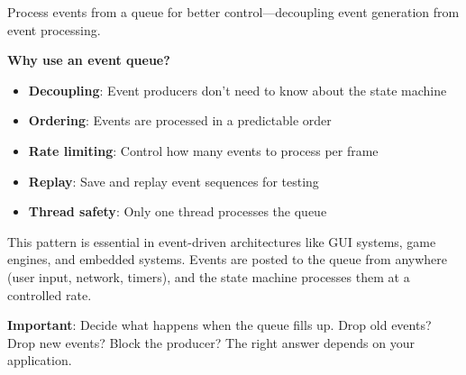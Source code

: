 Process events from a queue for better control—decoupling event generation from event processing.

\textbf{Why use an event queue?}

\begin{itemize}
    \item \textbf{Decoupling}: Event producers don't need to know about the state machine
    \item \textbf{Ordering}: Events are processed in a predictable order
    \item \textbf{Rate limiting}: Control how many events to process per frame
    \item \textbf{Replay}: Save and replay event sequences for testing
    \item \textbf{Thread safety}: Only one thread processes the queue
\end{itemize}

This pattern is essential in event-driven architectures like GUI systems, game engines, and embedded systems. Events are posted to the queue from anywhere (user input, network, timers), and the state machine processes them at a controlled rate.

\textbf{Important}: Decide what happens when the queue fills up. Drop old events? Drop new events? Block the producer? The right answer depends on your application.

